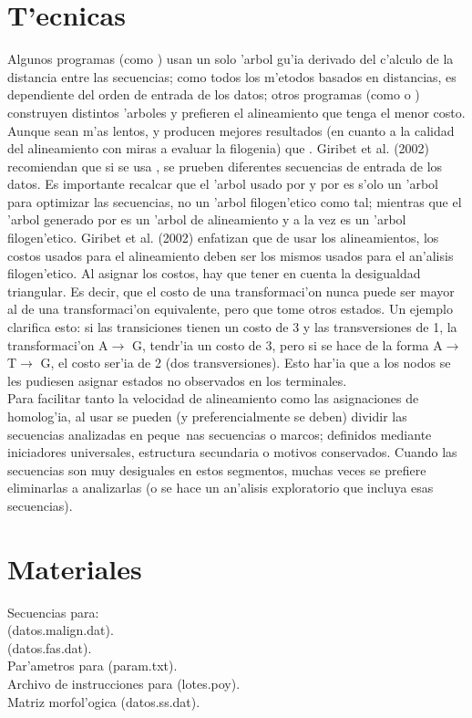 \section{T'ecnicas}
Algunos programas (como ) usan un solo 'arbol gu'ia derivado del c'alculo de la distancia entre las 
secuencias; como todos los m'etodos basados en distancias, es dependiente del orden de entrada de los datos; otros 
programas (como  o ) construyen distintos 'arboles y prefieren el alineamiento que tenga el menor 
costo. Aunque sean m'as lentos,  y  producen mejores resultados (en cuanto a la calidad del 
alineamiento con miras a evaluar la filogenia) que . Giribet et al. (2002) recomiendan que si se usa 
, se prueben diferentes secuencias de entrada de los datos. Es importante recalcar que el 'arbol usado por 
 y por  es s'olo un 'arbol para optimizar las secuencias, no un 'arbol filogen'etico como tal; 
mientras que el 'arbol generado por  es un 'arbol de alineamiento y a la vez es un 'arbol filogen'etico. Giribet 
et al. (2002) enfatizan que de usar los alineamientos, los costos usados para el alineamiento deben ser los mismos usados 
para el an'alisis filogen'etico. Al asignar los costos, hay que tener en cuenta la desigualdad triangular. Es decir, que el 
costo de una transformaci'on nunca puede ser mayor al de una transformaci'on equivalente, pero que tome otros estados. 
Un ejemplo clarifica esto: si las transiciones tienen un costo de 3 y las transversiones de 1, la transformaci'on 
A$\rightarrow$ G, tendr'ia un costo de 3, pero si se hace de la forma A$\rightarrow$ T$\rightarrow$ G, el costo ser'ia de 
2 (dos transversiones). Esto har'ia que a los nodos se les pudiesen asignar estados no observados en los terminales.\\
Para facilitar tanto la velocidad de alineamiento como las asignaciones de homolog'ia, al usar  se pueden 
(y preferencialmente se deben) dividir las secuencias analizadas en peque~nas secuencias o marcos; definidos mediante 
iniciadores universales, estructura secundaria o motivos conservados. Cuando las secuencias son muy desiguales en estos 
segmentos, muchas veces se prefiere eliminarlas a analizarlas (o se hace un an'alisis exploratorio que incluya esas 
secuencias).
\section{Materiales}
\noindent
Secuencias para:\\
 (datos.malign.dat).\\
 (datos.fas.dat).\\
Par'ametros para  (param.txt).\\
Archivo de instrucciones para  (lotes.poy).\\
Matriz morfol'ogica (datos.ss.dat).
